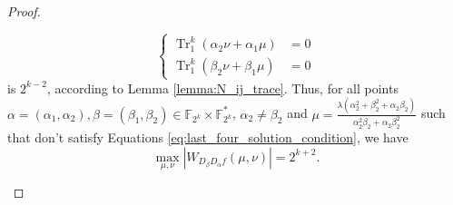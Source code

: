 \documentclass{article}
\newcommand{\F}{\mathbb{F}}
\newcommand{\0}{\textbf{0}}
\newcommand{\1}{\textbf{1}}
\newcommand{\TRACE}{\operatorname{Tr}_1^k}
\theoremstyle{plain}
\begin{document}
\begin{proof}
\begin{enumerate}[label=\textbf{Case \arabic*},wide = 0pt]
\begin{enumerate}[label=\textbf{Subcase \Alph{*}},itemindent=*,wide=\parindent]
                \begin{equation}\label{eq:max_foursolution_condition}
                    \left\{
                    \begin{alignedat}{2}
                        \TRACE\left(\alpha_2\nu+\alpha_1\mu\right)&=0\\
                        \TRACE\left(\beta_2\nu +\beta_1 \mu\right)&=0
                    \end{alignedat}
                    \right.
                \end{equation}
                is $2^{k-2}$, according to Lemma \ref{lemma:N_ij_trace}. 
                Thus, for all points $\alpha=(\alpha_1,\alpha_2),\beta=(\beta_1,\beta_2) \in\F_{2^k}\times\F_{2^k}^*$, $\alpha_2\ne\beta_2$ 
                and $\mu=\frac{\lambda(\alpha_2^2+\beta_2^2+\alpha_2\beta_2)}{\alpha_2^2\beta_2+\alpha_2\beta_2^2}$ 
                such that don't satisfy Equations \eqref{eq:last_four_solution_condition}, we have 
                \[\max_{\mu,\nu}|W_{D_{\beta}D_{\alpha}f}(\mu,\nu)|=2^{k+2}.\]
        

\end{enumerate}
\end{enumerate}
\end{proof}
\end{document}
